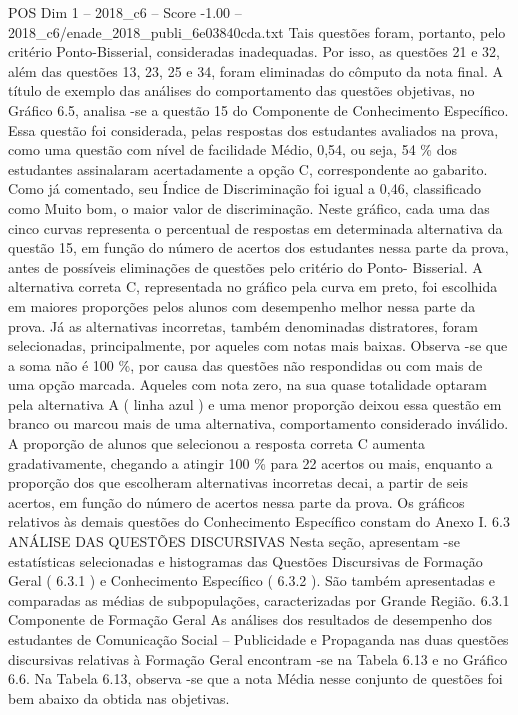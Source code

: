 \begin{textsample}{POS Dim 1 – 2018\_c6 – Score -1.00 – 2018\_c6/enade\_2018\_publi\_6e03840cda.txt}
Tais questões foram, portanto, pelo critério Ponto-Bisserial, consideradas inadequadas.
Por isso, as questões 21 e 32, além das questões 13, 23, 25 e 34, foram eliminadas do cômputo da nota final.
A título de exemplo das análises do comportamento das questões objetivas, no Gráfico 6.5, analisa -se a questão 15 do Componente de Conhecimento Específico.
Essa questão foi considerada, pelas respostas dos estudantes avaliados na prova, como uma questão com nível de facilidade Médio, 0,54, ou seja, 54 \% dos estudantes assinalaram acertadamente a opção C, correspondente ao gabarito.
Como já comentado, seu Índice de Discriminação foi igual a 0,46, classificado como Muito bom, o maior valor de discriminação.
Neste gráfico, cada uma das cinco curvas representa o percentual de respostas em determinada alternativa da questão 15, em função do número de acertos dos estudantes nessa parte da prova, antes de possíveis eliminações de questões pelo critério do Ponto- Bisserial.
A alternativa correta C, representada no gráfico pela curva em preto, foi escolhida em maiores proporções pelos alunos com desempenho melhor nessa parte da prova.
Já as alternativas incorretas, também denominadas distratores, foram selecionadas, principalmente, por aqueles com notas mais baixas.
Observa -se que a soma não é 100 \%, por causa das questões não respondidas ou com mais de uma opção marcada.
Aqueles com nota zero, na sua quase totalidade optaram pela alternativa A ( linha azul ) e uma menor proporção deixou essa questão em branco ou marcou mais de uma alternativa, comportamento considerado inválido.
A proporção de alunos que selecionou a resposta correta C aumenta gradativamente, chegando a atingir 100 \% para 22 acertos ou mais, enquanto a proporção dos que escolheram alternativas incorretas decai, a partir de seis acertos, em função do número de acertos nessa parte da prova.
Os gráficos relativos às demais questões do Conhecimento Específico constam do Anexo I. 6.3 ANÁLISE DAS QUESTÕES DISCURSIVAS Nesta seção, apresentam -se estatísticas selecionadas e histogramas das Questões Discursivas de Formação Geral ( 6.3.1 ) e Conhecimento Específico ( 6.3.2 ).
São também apresentadas e comparadas as médias de subpopulações, caracterizadas por Grande Região. 6.3.1 Componente de Formação Geral As análises dos resultados de desempenho dos estudantes de Comunicação Social – Publicidade e Propaganda nas duas questões discursivas relativas à Formação Geral encontram -se na Tabela 6.13 e no Gráfico 6.6.
Na Tabela 6.13, observa -se que a nota Média nesse conjunto de questões foi bem abaixo da obtida nas objetivas.

\end{textsample}
